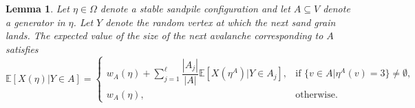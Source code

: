 \documentclass[10pt,a4paper]{amsart}
\newtheorem{lemma}{Lemma}
\begin{document}
\begin{lemma}\label{exp_av_size_rec_thm}
  Let $\eta \in \Omega$ denote a stable sandpile configuration and let $A \subseteq V$ denote a generator in $\eta$. Let $Y$ denote the random vertex at which the next sand grain lands. The expected value of the size of the next avalanche corresponding to $A$ satisfies
  \begin{equation}\label{exp_av_size_rec_eq}
      \mathbb{E}[X(\eta)|Y \in A] = \begin{cases}
          w_A(\eta) + \sum\limits_{j=1}^{\ell} \dfrac{|A_j|}{|A|} \mathbb{E}[X(\eta^A)|Y \in A_j], &\text{if } \{v \in A|\eta^A(v) = 3\} \neq \emptyset, \\
          w_A(\eta), &\text{otherwise}. 
      \end{cases}
  \end{equation}
\end{lemma}
\end{document}
